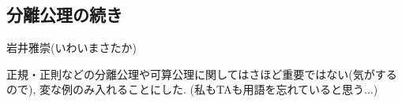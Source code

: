 \documentclass[dvipdfmx,a4paper,11pt]{article}
\newcommand{\R}{\mathbb{R}}
\theoremstyle{definition}
\begin{document}
\begin{enumerate}[label=\textbf{問}\ref*{sec-Hausdorff}.\arabic*]


	
 \end{enumerate}
 

\newpage


\begin{center}
\section{分離公理の続き}
\label{sec-countable}
\end{center}

\begin{flushright}
 岩井雅崇(いわいまさたか)
\end{flushright}

正規・正則などの分離公理や可算公理に関してはさほど重要ではない(気がするので), 変な例のみ入れることにした. (私もTAも用語を忘れていると思う...)
\end{document}

